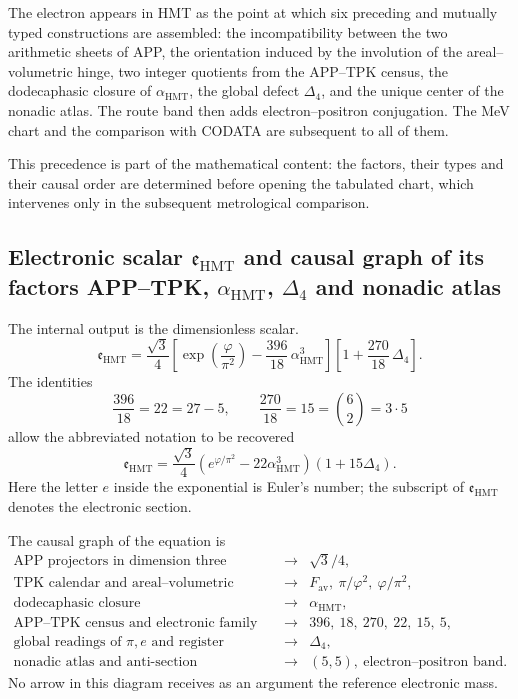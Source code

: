 The electron appears in HMT as the point at which six
preceding and mutually typed constructions are assembled: the incompatibility between
the two arithmetic sheets of APP, the orientation induced by the involution
of the areal--volumetric hinge, two integer quotients from the APP--TPK census,
the dodecaphasic
closure of \(\alpha_{\mathrm{HMT}}\), the global defect
\(\Delta_4\), and the unique center of the nonadic atlas. The route band then adds
electron--positron conjugation. The MeV chart and the comparison
with CODATA are subsequent to all of them.

This precedence is part of the mathematical content: the factors, their
types and their causal order are determined before opening the tabulated chart, which
intervenes only in the subsequent metrological comparison.

\subsection{Electronic scalar \(\mathfrak e_{\mathrm{HMT}}\) and causal graph of its factors APP–TPK, \(\alpha_{\mathrm{HMT}}\), \(\Delta_4\) and nonadic atlas}

The internal output is the dimensionless scalar.
\begin{equation}
 \label{p12-83-c15-s2:eq:electron-holografico-rev6}
 \boxed{
 \mathfrak e_{\mathrm{HMT}}
 =
 \frac{\sqrt3}{4}
 \left[
 \exp\!\left(\frac{\varphi}{\pi^2}\right)
 -\frac{396}{18}\,\alpha_{\mathrm{HMT}}^3
 \right]
 \left[
 1+\frac{270}{18}\,\Delta_4
 \right].}
\end{equation}
The identities
\[
 \frac{396}{18}=22=27-5,
 \qquad
 \frac{270}{18}=15=\binom62=3\cdot5
 \]
allow the abbreviated notation to be recovered
\[
 \mathfrak e_{\mathrm{HMT}}
 =
 \frac{\sqrt3}{4}
 \left(e^{\varphi/\pi^2}-22\alpha_{\mathrm{HMT}}^3\right)
 (1+15\Delta_4).
\]
Here the letter \(e\) inside the exponential is Euler's number; the
subscript of \(\mathfrak e_{\mathrm{HMT}}\) denotes the electronic section.

The causal graph of the equation is
\[
\begin{array}{ccl}
\text{APP projectors in dimension three}
&\longrightarrow& \sqrt3/4,\\[2mm]
\text{TPK calendar and areal--volumetric sheets}
&\longrightarrow&
F_{\mathrm{av}},\ \pi/\varphi^2,\
\varphi/\pi^2,\\[2mm]
\text{dodecaphasic closure}
&\longrightarrow&\alpha_{\mathrm{HMT}},\\[2mm]
\text{APP--TPK census and electronic family}
&\longrightarrow&396,\ 18,\ 270,\ 22,\ 15,\ 5,\\[2mm]
\text{global readings of }\pi,e\text{ and register}
&\longrightarrow&\Delta_4,\\[2mm]
\text{nonadic atlas and anti-section}
&\longrightarrow&(5,5),\
\text{electron--positron band}.
\end{array}
\]
No arrow in this diagram receives as an argument the reference electronic mass.

